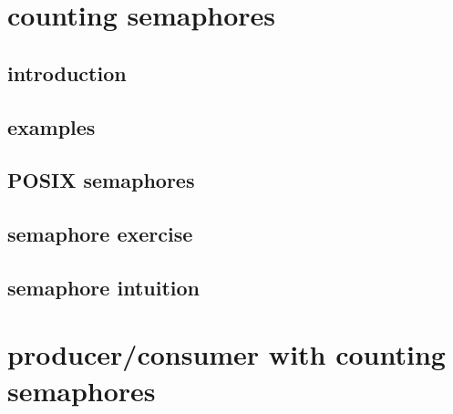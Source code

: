 
\section{counting semaphores}

\subsection{introduction}



\subsection{examples}



\subsection{POSIX semaphores}



\subsection{semaphore exercise}


\subsection{semaphore intuition}


\section{producer/consumer with counting semaphores}



